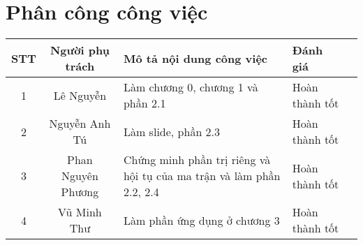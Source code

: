 

\renewcommand{\P}{\mathbb{P}}
\graphicspath{ {figure/} }
\setcounter{MaxMatrixCols}{20}



\tableofcontents
\listoffigures
\pagebreak

\chapter*{Phân công công việc}
\begin{center}
\begin{tabular}{|c|c|>{\raggedright\arraybackslash}p{4cm}|>{\raggedright\arraybackslash}p{4cm}|l|}
    \hline
    STT & Người phụ trách & Mô tả nội dung công việc & Đánh giá\\
    \hline
    1 & Lê Nguyễn & Làm chương 0, chương 1 và phần 2.1 & Hoàn thành tốt\\
    \hline
    2 & Nguyễn Anh Tú & Làm slide, phần 2.3 & Hoàn thành tốt\\
    \hline
    3 & Phan Nguyên Phương & Chứng minh phần trị riêng và hội tụ của ma trận và làm phần 2.2, 2.4 & Hoàn thành tốt\\
    \hline
    4 & Vũ Minh Thư & Làm phần ứng dụng ở chương 3 & Hoàn thành tốt\\
    \hline
\end{tabular}
\end{center}

% 








\nocite{*} 



